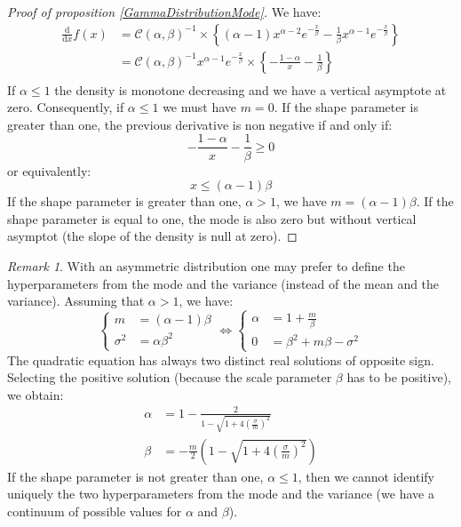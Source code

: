 \documentclass{amsart}
\theoremstyle{plain}
\theoremstyle{remark}
\newtheorem{remark}{Remark}[section]
\numberwithin{equation}{section}
\begin{document}
 \begin{proof}[Proof of proposition \ref{GammaDistributionMode}]
   We have:
   \[
     \begin{split}
     \frac{\mathrm d}{\mathrm dx} f(x) &= \mathcal{C}(\alpha,\beta)^{-1}
     \times
     \left\{
         (\alpha-1)x^{\alpha-2}e^{-\frac{x}{\beta}}-\frac{1}{\beta}x^{\alpha-1}e^{-\frac{x}{\beta}}
     \right\} \\
      &= \mathcal{C}(\alpha,\beta)^{-1} x^{\alpha-1}e^{-\frac{x}{\beta}}
      \times
      \left\{ -\frac{1-\alpha}{x}-\frac{1}{\beta} \right\} \\
     \end{split}
   \]
   If $\alpha\leq 1$ the density is monotone decreasing and we have a vertical asymptote at zero. Consequently, if $\alpha\leq 1$ we must have $m=0$. If the shape parameter is greater than one, the previous derivative is non negative if and only if:
   \[
     -\frac{1-\alpha}{x}-\frac{1}{\beta}\geq 0
   \]
   or equivalently:
   \[
     x \leq (\alpha-1)\beta
   \]
   If the shape parameter is greater than one, $\alpha>1$, we have $m=(\alpha-1)\beta$. If the shape parameter is equal to one, the mode is also zero but without vertical asymptot (the slope of the density is null at zero).
 \end{proof}

 \begin{remark}
   With an asymmetric distribution one may prefer to define the hyperparameters from the mode and the variance (instead of the mean and the variance). Assuming that $\alpha>1$, we have:
   \[
     \begin{cases}
       m &= (\alpha-1)\beta\\
       \sigma^2 &= \alpha\beta^2
     \end{cases}
     \Leftrightarrow
     \begin{cases}
       \alpha &= 1+\frac{m}{\beta} \\
       0 &= \beta^2+m\beta-\sigma^2
     \end{cases}
   \]
   The quadratic equation has always two distinct real solutions of opposite sign. Selecting the positive solution (because the scale parameter $\beta$ has to be positive), we obtain:
   \[
     \begin{split}
       \alpha &= 1 - \frac{2}{1-\sqrt{1+4\left(\frac{\sigma}{m}\right)^2}}\\
       \beta &= -\frac{m}{2}\left(1-\sqrt{1+4\left(\frac{\sigma}{m}\right)^2}\right)
     \end{split}
   \]
   If the shape parameter is not greater than one, $\alpha\leq 1$, then we cannot identify uniquely the two hyperparameters from the mode and the variance (we have a continuum of possible values for $\alpha$ and $\beta$).
 \end{remark}
\end{document}
